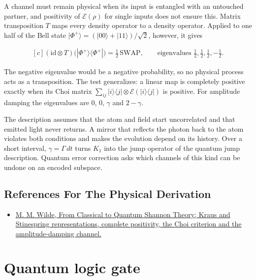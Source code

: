 \documentclass[11pt,oneside]{book}
\newenvironment{centeredalign}{\[\begin{gathered}[c]}{\end{gathered}\]}
\begin{document}
A channel must remain physical when its input is entangled with an untouched partner, and positivity of \(\mathcal E(\rho)\) for single inputs does not ensure this. Matrix transposition \(T\) maps every density operator to a density operator. Applied to one half of the Bell state \(|\Phi^+\rangle=(|00\rangle+|11\rangle)/\sqrt2\), however, it gives

\begin{centeredalign}
(\mathrm{id}\otimes T)\big(|\Phi^+\rangle\langle\Phi^+|\big)=\tfrac12\,\mathrm{SWAP},
\qquad \text{eigenvalues } \tfrac12,\tfrac12,\tfrac12,-\tfrac12.
\end{centeredalign}

The negative eigenvalue would be a negative probability, so no physical process acts as a transposition. The test generalizes: a linear map is completely positive exactly when its Choi matrix \(\sum_{ij}|i\rangle\langle j|\otimes\mathcal E(|i\rangle\langle j|)\) is positive. For amplitude damping the eigenvalues are \(0\), \(0\), \(\gamma\) and \(2-\gamma\).

The description assumes that the atom and field start uncorrelated and that emitted light never returns. A mirror that reflects the photon back to the atom violates both conditions and makes the evolution depend on its history. Over a short interval, \(\gamma=\Gamma\,dt\) turns \(K_1\) into the jump operator of the quantum jump description. Quantum error correction asks which channels of this kind can be undone on an encoded subspace.

\subsection*{References For The Physical Derivation}
\begin{itemize}
\item \href{https://arxiv.org/abs/1106.1445}{M. M. Wilde, From Classical to Quantum Shannon Theory; Kraus and Stinespring representations, complete positivity, the Choi criterion and the amplitude-damping channel.}
\end{itemize}





\clearpage

\section{Quantum logic gate}

\label{topic:quantum-logic-gate}
\end{document}
